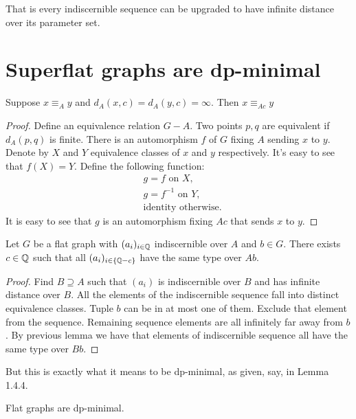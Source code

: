 That is every indiscernible sequence can be upgraded to have infinite distance over its parameter set.

\section{Superflat graphs are dp-minimal}

\begin{Lemma}
  Suppose $x \equiv_A y$ and $d_A(x, c) = d_A(y, c) = \infty$. Then $x \equiv_{Ac} y$
\end{Lemma}

\begin{proof}
  Define an equivalence relation $G - A$. Two points $p, q$ are equivalent if $d_A(p,q)$ is finite. There is an automorphism $f$ of $G$ fixing $A$ sending $x$ to $y$. Denote by $X$ and $Y$ equivalence classes of $x$ and $y$ respectively. It's easy to see that $f(X) = Y$. Define the following function:
  \begin{align*}
    &g = f \text { on } X, \\
    &g = f^{-1} \text { on } Y, \\
    &\text{identity otherwise.}
  \end{align*}
  It is easy to see that $g$ is an automorphism fixing $Ac$ that sends $x$ to $y$.
\end{proof}

\begin{Theorem}
  Let $G$ be a flat graph with $(a_i)_{i\in\mathbb{Q}}$ indiscernible over $A$ and $b \in G$. There exists $c \in \mathbb{Q}$ such that all $(a_i)_{i\in\{\mathbb{Q} - c\}}$ have the same type over $Ab$.
\end{Theorem}

\begin{proof}
  Find $B \supseteq A$ such that $(a_i)$ is indiscernible over $B$ and has infinite distance over $B$. All the elements of the indiscernible sequence fall into distinct equivalence classes. Tuple $b$ can be in at most one of them. Exclude that element from the sequence. Remaining sequence elements are all infinitely far away from $b$. By previous lemma we have that elements of indiscernible sequence all have the same type over $Bb$.
\end{proof}

But this is exactly what it means to be dp-minimal, as given, say, in \cite{simon_dp_min} Lemma 1.4.4.

\begin{Corollary}
  Flat graphs are dp-minimal.
\end{Corollary}
